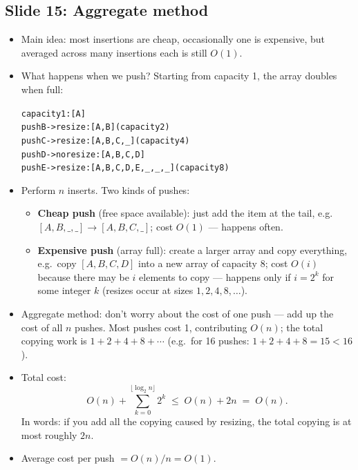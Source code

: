 \documentclass[11pt]{article}
\newcommand{\slide}[2]{\subsection*{Slide #1: #2}}
\begin{document}
\slide{15}{Aggregate method}
\begin{itemize}
  \item Main idea: most insertions are cheap, occasionally one is expensive, but averaged across many insertions each is still $O(1)$.
  \item What happens when we push? Starting from capacity 1, the array doubles when full:
        \begin{alltt}
capacity 1: [A]
push B -> resize: [A, B]                        (capacity 2)
push C -> resize: [A, B, C, \_]                 (capacity 4)
push D -> no resize: [A, B, C, D]
push E -> resize: [A, B, C, D, E, \_, \_, \_]   (capacity 8)
        \end{alltt}
  \item Perform $n$ inserts. Two kinds of pushes:
  \begin{itemize}
    \item \textbf{Cheap push} (free space available): just add the item at the tail, e.g.\ $[A,B,\_,\_] \to [A,B,C,\_]$; cost $O(1)$ --- happens often.
    \item \textbf{Expensive push} (array full): create a larger array and copy everything, e.g.\ copy $[A,B,C,D]$ into a new array of capacity 8; cost $O(i)$ because there may be $i$ elements to copy --- happens only if $i = 2^k$ for some integer $k$ (resizes occur at sizes $1, 2, 4, 8, \ldots$).
  \end{itemize}
  \item Aggregate method: don't worry about the cost of one push --- add up the cost of all $n$ pushes. Most pushes cost 1, contributing $O(n)$; the total copying work is $1 + 2 + 4 + 8 + \cdots$ (e.g.\ for 16 pushes: $1 + 2 + 4 + 8 = 15 < 16$).
  \item Total cost:
        \[ O(n) + \sum_{k=0}^{\lfloor \log_2 n \rfloor} 2^k \;\le\; O(n) + 2n \;=\; O(n). \]
        In words: if you add all the copying caused by resizing, the total copying is at most roughly $2n$.
  \item Average cost per push $= O(n)/n = O(1)$.
\end{itemize}
\end{document}
